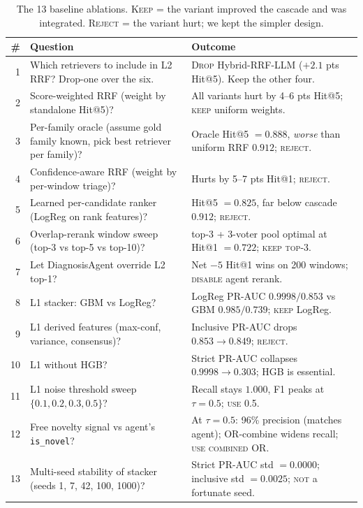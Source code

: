 \begin{table}[h]
\centering
\caption{The 13 baseline ablations. \textsc{Keep} = the variant improved the cascade and was integrated. \textsc{Reject} = the variant hurt; we kept the simpler design.}
\label{tab:baseline-ablations}
\small
\setlength{\tabcolsep}{4pt}
\renewcommand{\arraystretch}{1.15}
\begin{tabularx}{\linewidth}{@{}r >{\raggedright\arraybackslash}X >{\raggedright\arraybackslash}X@{}}
\toprule
\# & Question & Outcome \\
\midrule
1 & Which retrievers to include in L2 RRF? Drop-one over the six. & \textsc{Drop} Hybrid-RRF-LLM ($+2.1$ pts Hit@5). Keep the other four. \\
2 & Score-weighted RRF (weight by standalone Hit@5)? & All variants hurt by 4--6 pts Hit@5; \textsc{keep} uniform weights. \\
3 & Per-family oracle (assume gold family known, pick best retriever per family)? & Oracle Hit@5 $= 0.888$, \emph{worse} than uniform RRF $0.912$; \textsc{reject}. \\
4 & Confidence-aware RRF (weight by per-window triage)? & Hurts by 5--7 pts Hit@1; \textsc{reject}. \\
5 & Learned per-candidate ranker (LogReg on rank features)? & Hit@5 $= 0.825$, far below cascade $0.912$; \textsc{reject}. \\
6 & Overlap-rerank window sweep (top-3 vs top-5 vs top-10)? & top-3 + 3-voter pool optimal at Hit@1 $= 0.722$; \textsc{keep top-3}. \\
7 & Let DiagnosisAgent override L2 top-1? & Net $-5$ Hit@1 wins on 200 windows; \textsc{disable} agent rerank. \\
8 & L1 stacker: GBM vs LogReg? & LogReg PR-AUC $0.9998 / 0.853$ vs GBM $0.985 / 0.739$; \textsc{keep} LogReg. \\
9 & L1 derived features (max-conf, variance, consensus)? & Inclusive PR-AUC drops $0.853 \to 0.849$; \textsc{reject}. \\
10 & L1 without HGB? & Strict PR-AUC collapses $0.9998 \to 0.303$; HGB is essential. \\
11 & L1 noise threshold sweep $\{0.1, 0.2, 0.3, 0.5\}$? & Recall stays $1.000$, F1 peaks at $\tau = 0.5$; \textsc{use} 0.5. \\
12 & Free novelty signal vs agent's \texttt{is\_novel}? & At $\tau = 0.5$: 96\% precision (matches agent); OR-combine widens recall; \textsc{use combined OR}. \\
13 & Multi-seed stability of stacker (seeds 1, 7, 42, 100, 1000)? & Strict PR-AUC std $= 0.0000$; inclusive std $= 0.0025$; \textsc{not} a fortunate seed. \\
\bottomrule
\end{tabularx}
\end{table}

